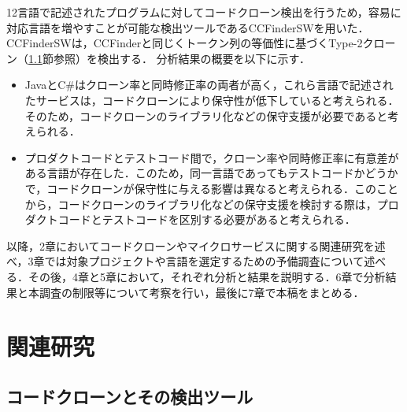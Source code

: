 \documentclass[T,J]{fose}
\begin{document}
12言語で記述されたプログラムに対してコードクローン検出を行うため，容易に対応言語を増やすことが可能な検出ツールであるCCFinderSW\cite{CCFinderSW}を用いた．CCFinderSWは，CCFinder\cite{CCFinder}と同じくトークン列の等価性に基づくType-2クローン（\ref{subsec:clone}節参照）を検出する．
分析結果の概要を以下に示す．
\begin{itemize}
    \item JavaとC\#はクローン率と同時修正率の両者が高く，これら言語で記述されたサービスは，コードクローンにより保守性が低下していると考えられる．そのため，コードクローンのライブラリ化などの保守支援が必要であると考えられる．
    \item プロダクトコードとテストコード間で，クローン率や同時修正率に有意差がある言語が存在した．このため，同一言語であってもテストコードかどうかで，コードクローンが保守性に与える影響は異なると考えられる．このことから，コードクローンのライブラリ化などの保守支援を検討する際は，プロダクトコードとテストコードを区別する必要があると考えられる．
\end{itemize}

以降，2章においてコードクローンやマイクロサービスに関する関連研究を述べ，3章では対象プロジェクトや言語を選定するための予備調査について述べる．その後，4章と5章において，それぞれ分析と結果を説明する．6章で分析結果と本調査の制限等について考察を行い，最後に7章で本稿をまとめる．


\section{関連研究}
\subsection{コードクローンとその検出ツール} \label{subsec:clone}
\end{document}
